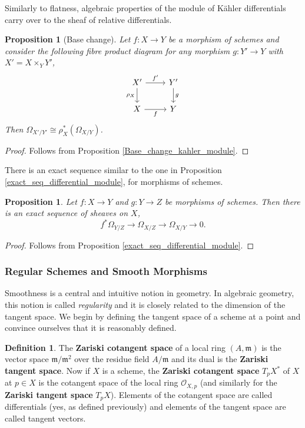 \documentclass{article}
\theoremstyle{plain}
\newtheorem{proposition}[theorem]{Proposition}
\theoremstyle{definition}
\newtheorem{definition}[theorem]{Definition}
\begin{document}
\noindent Similarly to flatness, algebraic properties of the module of K\"ahler differentials carry over to the sheaf of relative differentials.

\begin{proposition}[Base change]
\label{base_change_Kahler_sheaf}
    Let $f:X\rightarrow Y$ be a morphism of schemes and consider the following fibre product diagram for any morphism $g:Y'\rightarrow Y$ with $X' = X\times_Y Y'$,
    \[
    \begin{tikzcd}
        X'  \arrow[r,"f'"] \arrow[d, "\rho_X"']
        & Y' \arrow[d,"g"] \\
        X \arrow[r,"f"']
        &  Y
    \end{tikzcd}
    \]
    Then $\Omega_{X'/Y'} \cong \rho_X^*(\Omega_{X/Y})$.
\end{proposition}
\begin{proof}
    Follows from Proposition \ref{Base_change_kahler_module}.
\end{proof}

\noindent There is an exact sequence similar to the one in Proposition \ref{exact_seq_differential_module}, for morphisms of schemes.
\begin{proposition}
\label{exact_seq_sheaves_differential}
    Let $f:X\rightarrow Y$ and $g:Y\rightarrow Z$ be morphisms of schemes. Then there is an exact sequence of sheaves on $X$,
    $$f^*\Omega_{Y/Z} \rightarrow \Omega_{X/Z} \rightarrow \Omega_{X/Y} \rightarrow 0.$$
\end{proposition}
\begin{proof}
    Follows from Proposition \ref{exact_seq_differential_module}.
\end{proof}





\subsubsection{Regular Schemes and Smooth Morphisms}

Smoothness is a central and intuitive notion in geometry. In algebraic geometry, this notion is called \textit{regularity} and it is closely related to the dimension of the tangent space.
We begin by defining the tangent space of a scheme at a point and convince ourselves that it is reasonably defined.

\begin{definition}
    The \textbf{Zariski cotangent space} of a local ring $(A,\mathfrak{m})$ is the vector space $\mathfrak{m}/{\mathfrak{m^2}}$ over the residue field $A/\mathfrak{m}$ and its dual is the \textbf{Zariski tangent space}.
    Now if $X$ is a scheme, the \textbf{Zariski cotangent space} $T_pX^*$ of $X$ at $p\in X$ is the cotangent space of the local ring $\mathcal{O}_{X,p}$ (and similarly for the \textbf{Zariski tangent space} $T_pX$).
    Elements of the cotangent space are called differentials (yes, as defined previously) and elements of the tangent space are called tangent vectors.
\end{definition}
\end{document}
